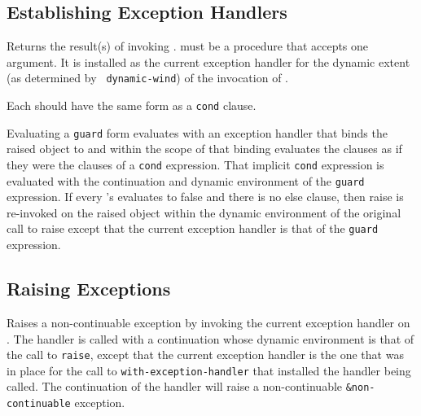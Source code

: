 \subsection{Establishing Exception Handlers}

\begin{entry}{%
}

Returns the result(s) of invoking .  must be a
procedure that accepts one argument. It is installed as the current
exception handler for the dynamic extent (as determined by {\tt
  dynamic-wind}) of the invocation of .
\end{entry}

\begin{entry}{%
}

\syntax
Each  should have the same form as a {\tt cond} clause.

\semantics 
Evaluating a {\tt guard} form evaluates  with an exception
handler that binds the raised object to  and within the scope of
that binding evaluates the clauses as if they were the clauses of a
{\tt cond} expression. That implicit {\tt cond} expression is evaluated with the
continuation and dynamic environment of the {\tt guard} expression. If every
's  evaluates to false and there is no else clause, then
raise is re-invoked on the raised object within the dynamic
environment of the original call to raise except that the current
exception handler is that of the {\tt guard} expression.  
\end{entry}

\subsection{Raising Exceptions}

\begin{entry}{%
}

Raises a non-continuable exception by invoking the current exception
handler on . The handler is called with a continuation whose
dynamic environment is that of the call to {\tt raise}, except that
the current exception handler is the one that was in place for the
call to {\tt with-exception-handler} that installed the handler being
called.  The continuation of the handler will raise a non-continuable
{\tt \&non-continuable} exception.
\end{entry}

